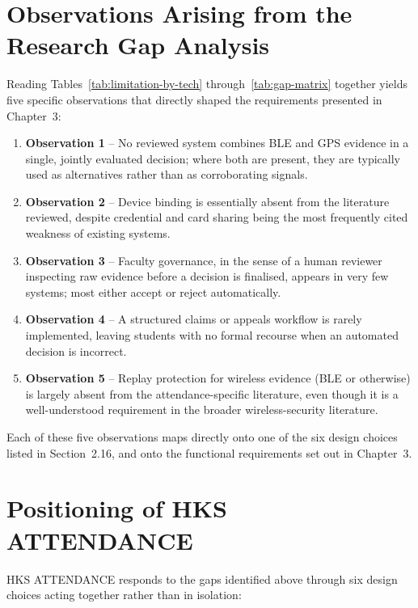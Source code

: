 \documentclass[12pt, a4paper, oneside]{report}
\begin{document}
\section{Observations Arising from the Research Gap Analysis}

Reading Tables~\ref{tab:limitation-by-tech} through~\ref{tab:gap-matrix} together yields five specific observations that directly shaped the requirements presented in Chapter~3:

\begin{enumerate}
    \item \textbf{Observation 1} -- No reviewed system combines BLE and GPS evidence in a single, jointly evaluated decision; where both are present, they are typically used as alternatives rather than as corroborating signals.
    \item \textbf{Observation 2} -- Device binding is essentially absent from the literature reviewed, despite credential and card sharing being the most frequently cited weakness of existing systems.
    \item \textbf{Observation 3} -- Faculty governance, in the sense of a human reviewer inspecting raw evidence before a decision is finalised, appears in very few systems; most either accept or reject automatically.
    \item \textbf{Observation 4} -- A structured claims or appeals workflow is rarely implemented, leaving students with no formal recourse when an automated decision is incorrect.
    \item \textbf{Observation 5} -- Replay protection for wireless evidence (BLE or otherwise) is largely absent from the attendance-specific literature, even though it is a well-understood requirement in the broader wireless-security literature.
\end{enumerate}

Each of these five observations maps directly onto one of the six design choices listed in Section~2.16, and onto the functional requirements set out in Chapter~3.

\section{Positioning of HKS ATTENDANCE}

HKS ATTENDANCE responds to the gaps identified above through six design choices acting together rather than in isolation:
\end{document}
